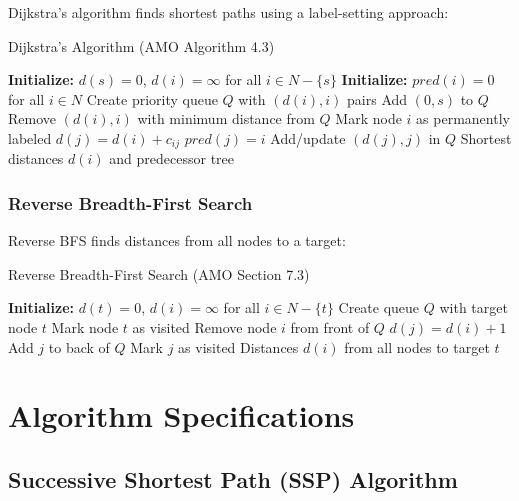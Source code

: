 \documentclass[12pt,a4paper]{article}
\begin{document}
Dijkstra's algorithm finds shortest paths using a label-setting approach:

\begin{algorithm}[H]
\caption{Dijkstra's Algorithm (AMO Algorithm 4.3)}
\begin{algorithmic}[1]
\STATE \textbf{Initialize:} $d(s) = 0$, $d(i) = \infty$ for all $i \in N - \{s\}$
\STATE \textbf{Initialize:} $pred(i) = 0$ for all $i \in N$
\STATE Create priority queue $Q$ with $(d(i), i)$ pairs
\STATE Add $(0, s)$ to $Q$
    \STATE Remove $(d(i), i)$ with minimum distance from $Q$
    \STATE Mark node $i$ as permanently labeled
            \STATE $d(j) = d(i) + c_{ij}$
            \STATE $pred(j) = i$
            \STATE Add/update $(d(j), j)$ in $Q$
        \ENDIF
    \ENDFOR
\ENDWHILE
\RETURN Shortest distances $d(i)$ and predecessor tree
\end{algorithmic}
\end{algorithm}

\subsubsection{Reverse Breadth-First Search}

Reverse BFS finds distances from all nodes to a target:

\begin{algorithm}[H]
\caption{Reverse Breadth-First Search (AMO Section 7.3)}
\begin{algorithmic}[1]
\STATE \textbf{Initialize:} $d(t) = 0$, $d(i) = \infty$ for all $i \in N - \{t\}$
\STATE Create queue $Q$ with target node $t$
\STATE Mark node $t$ as visited
    \STATE Remove node $i$ from front of $Q$
            \STATE $d(j) = d(i) + 1$
            \STATE Add $j$ to back of $Q$
            \STATE Mark $j$ as visited
        \ENDIF
    \ENDFOR
\ENDWHILE
\RETURN Distances $d(i)$ from all nodes to target $t$
\end{algorithmic}
\end{algorithm}

\section{Algorithm Specifications}

\subsection{Successive Shortest Path (SSP) Algorithm}
\end{document}
